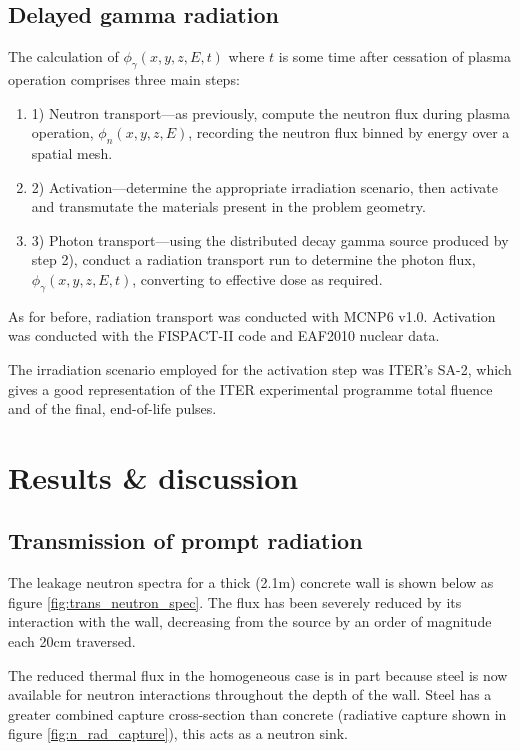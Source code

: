 
\subsection{Delayed gamma radiation}

The calculation of $\phi_{\gamma}(x,y,z,E,t)$ where $t$ is some time after cessation of plasma operation comprises three main steps:
\begin{enumerate}
  \item 1) Neutron transport---as previously, compute the neutron flux during plasma operation, $\phi_{n}(x,y,z,E)$, recording the neutron flux binned by energy over a spatial mesh. 
  \item 2) Activation---determine the appropriate irradiation scenario, then activate and transmutate the materials present in the problem geometry. 
  \item 3) Photon transport---using the distributed decay gamma source produced by step 2), conduct a radiation transport run to determine the photon flux, $\phi_{\gamma}(x,y,z,E,t)$, converting to effective dose as required.
\end{enumerate}

As for before, radiation transport was conducted with MCNP6 v1.0. Activation was conducted with the FISPACT-II code and EAF2010 nuclear data. \par
The irradiation scenario employed for the activation step was ITER's SA-2, which gives a good representation of the ITER experimental programme total fluence and of the final, end-of-life pulses.


\section{Results \& discussion}

\subsection{Transmission of prompt radiation}
\label{subsec:prompt}
The leakage neutron spectra for a thick (2.1m) concrete wall is shown below as figure \ref{fig:trans_neutron_spec}. The flux has been severely reduced by its interaction with the wall, decreasing from the source by an order of magnitude each 20cm traversed.\par
The reduced thermal flux in the homogeneous case is in part because steel is now available for neutron interactions throughout the depth of the wall. Steel has a greater combined capture cross-section than concrete (radiative capture shown in figure \ref{fig:n_rad_capture}), this acts as a neutron sink. 


